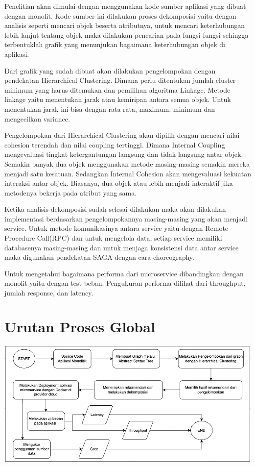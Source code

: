 Penelitian akan dimulai dengan menggunakan kode sumber aplikasi yang dibuat dengan monolit. Kode sumber ini dilakukan proses dekomposisi yaitu dengan analisis seperti mencari objek beserta atributnya, untuk mencari keterhubungan lebih lanjut tentang objek maka dilakukan pencarian pada fungsi-fungsi sehingga terbentuklah grafik yang menunjukan bagaimana keterhubungan objek di aplikasi.

Dari grafik yang sudah dibuat akan dilakukan pengelompokan dengan pendekatan Hierarchical Clustering. Dimana perlu ditentukan jumlah cluster minimum yang harus ditemukan dan pemilihan algoritma Linkage. Metode linkage yaitu menentukan jarak atau kemiripan antara semua objek. Untuk menentukan jarak ini bisa dengan rata-rata, maximum, minimum dan mengecilkan variance.

Pengelompokan dari Hierarchical Clustering akan dipilih dengan mencari nilai cohesion terendah dan  nilai coupling tertinggi. Dimana Internal Coupling mengevaluasi tingkat ketergantungan langsung dan tidak langsung antar objek. Semakin banyak dua objek menggunakan metode masing-masing semakin mereka menjadi satu kesatuan. Sedangkan Internal Cohesion akan mengevaluasi kekuatan interaksi antar objek. Biasanya, dua objek atau lebih menjadi interaktif jika metodenya bekerja pada atribut yang sama.

Ketika analisis dekomposisi sudah selesai dilakukan maka akan dilakukan implementasi berdasarkan pengelompokannya masing-masing yang akan menjadi service. Untuk metode komunikasinya antara service yaitu dengan Remote Procedure Call(RPC) dan untuk mengelola data, setiap service memiliki databasenya masing-masing dan untuk menjaga konsistensi data antar service maka digunakan pendekatan SAGA dengan cara choreography.

Untuk mengetahui bagaimana performa dari microservice dibandingkan dengan monolit yaitu dengan test beban. Pengukuran performa dilihat dari throughput, jumlah response, dan latency. 


\section{Urutan Proses Global}
\begin{center}
	\includegraphics[width=14cm]{img/FlowchartProsesGlobal.png}
	\label{fig:asd}
\end{center}

